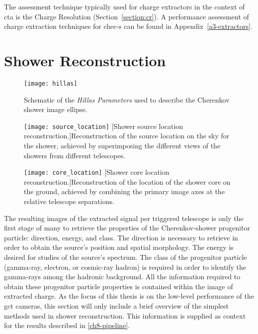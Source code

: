 The assessment technique typically used for charge extractors in the context of \gls{cta} is the Charge Resolution (Section~\ref{section:cr}). A performance assessment of charge extraction techniques for \gls{chec-s} can be found in Appendix~\ref{a3-extractors}.

\section{Shower Reconstruction}

\begin{figure}
	\centering
    \texttt{[image: hillas]} 
	\caption[Hillas Parametrisation Schematic.]{Schematic of the \textit{Hillas Parameters} used to describe the Cherenkov shower image ellipse.}
	\label{fig:hillas}
\end{figure}

\begin{figure}
\begin{minipage}[t]{.49\textwidth}
  \centering
  \texttt{[image: source\_location]} 
  [Shower source location reconstruction.]{Reconstruction of the source location on the sky for the shower, achieved by superimposing the different views of the showers from different telescopes.}
  \label{fig:source_location}
\end{minipage}%
\hfill
\begin{minipage}[t]{.49\textwidth}
  \centering
  \texttt{[image: core\_location]}
  [Shower core location reconstruction.]{Reconstruction of the location of the shower core on the ground, achieved by combining the primary image axes at the relative telescope separations.}
  \label{fig:core_location}
\end{minipage}
\end{figure}

The resulting images of the extracted signal per triggered telescope is only the first stage of many to retrieve the properties of the Cherenkov-shower progenitor particle: direction, energy, and class. The direction is necessary to retrieve in order to obtain the source's position and spatial morphology. The energy is desired for studies of the source's spectrum. The class of the progenitor particle (gamma-ray, electron, or cosmic-ray hadron) is required in order to identify the gamma-rays among the hadronic background. All the information required to obtain these progenitor particle properties is contained within the image of extracted charge. As the focus of this thesis is on the low-level performance of the \gls{gct} cameras, this section will only include a brief overview of the simplest methods used in shower reconstruction. This information is supplied as context for the results described in \ref{ch8-pipeline}.


